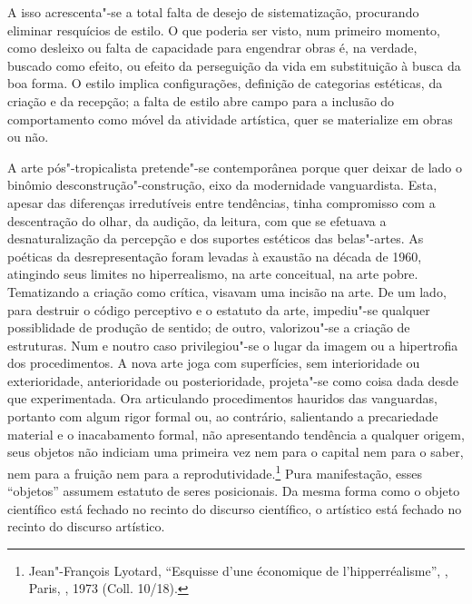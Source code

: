 A isso acrescenta"-se a total falta de desejo de sistematização,
procurando eliminar resquícios de estilo. O que poderia ser visto, num
primeiro momento, como desleixo ou falta de capacidade para engendrar
obras é, na verdade, buscado como efeito, ou efeito da perseguição da
vida em substituição à busca da boa forma. O estilo implica
configurações, definição de categorias estéticas, da criação e da
recepção; a falta de estilo abre campo para a inclusão do comportamento
como móvel da atividade artística, quer se materialize em obras ou não.

\asterisc

A arte pós"-tropicalista pretende"-se contemporânea porque quer deixar de
lado o binômio desconstrução"-construção, eixo da modernidade
vanguardista. Esta, apesar das diferenças irredutíveis entre tendências,
tinha compromisso com a descentração do olhar, da audição, da leitura,
com que se efetuava a desnaturalização da percepção e dos suportes
estéticos das belas"-artes. As poéticas da desrepresentação foram levadas
à exaustão na década de 1960, atingindo seus limites no hiperrealismo,
na arte conceitual, na arte pobre. Tematizando a criação como crítica,
visavam uma incisão na arte. De um lado, para destruir o código
perceptivo e o estatuto da arte, impediu"-se qualquer possiblidade de
produção de sentido; de outro, valorizou"-se a criação de estruturas. Num
e noutro caso privilegiou"-se o lugar da imagem ou a hipertrofia dos
procedimentos. A nova arte joga com superfícies, sem interioridade ou
exterioridade, anterioridade ou posterioridade, projeta"-se como coisa
dada desde que experimentada. Ora articulando procedimentos hauridos das
vanguardas, portanto com algum rigor formal ou, ao contrário,
salientando a precariedade material e o inacabamento formal, não
apresentando tendência a qualquer origem, seus objetos não indiciam uma
primeira vez nem para o capital nem para o saber, nem para a fruição nem
para a reprodutividade.\footnote{Jean"-François Lyotard, ``Esquisse
  d'une économique de l'hipperréalisme'', {}, Paris, , 1973 (Coll. 10/18).} Pura manifestação,
esses ``objetos'' assumem estatuto de seres posicionais. Da mesma forma
como o objeto científico está fechado no recinto do discurso científico,
o artístico está fechado no recinto do discurso artístico.

